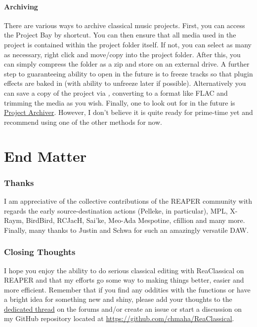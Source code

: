 \documentclass[10pt,american]{article}
\begin{document}
\subsection{Archiving}

There are various ways to archive classical music projects. First, you can
access the Project Bay by  shortcut. You can then ensure that all
media used in the project is contained within the project folder itself. If not,
you can select as many as necessary, right click and move/copy into the project
folder. After this, you can simply compress the folder as a zip and store on an
external drive. A further step to guaranteeing ability to open in the future is
to freeze tracks so that plugin effects are baked in (with ability to unfreeze
later if possible). Alternatively you can save a copy of the project via
 \emph{,} converting to a format like FLAC and
trimming the media as you wish. Finally, one to look out for in the future is
\href{https://forum.cockos.com/showthread.php?t=280150}{Project Archiver}.
However, I don't believe it is quite ready for prime-time yet and recommend
using one of the other methods for now.\pagebreak{}

\part{End Matter}

\section{Thanks}
\noindent\begin{flushleft} I am appreciative of the collective contributions of
the REAPER community with regards the early source-destination actions (Pelleke,
in particular), MPL, X-Raym, BirdBird, RCJacH, Sai'ke, Meo-Ada Mespotine,
cfillion and many more. Finally, many thanks to Justin and Schwa for such an
amazingly versatile DAW. \par\end{flushleft}

\section{Closing Thoughts}
\noindent\begin{flushleft} I hope you enjoy the ability to do serious classical
editing with ReaClassical on REAPER and that my efforts go some way to making
things better, easier and more efficient. Remember that if you find any oddities
with the functions or have a bright idea for something new and shiny, please add
your thoughts to the
\href{https://forum.cockos.com/showthread.php?t=265145}{dedicated thread} on the
forums and/or create an issue or start a discussion on my GitHub repository
located at
\href{https://github.com/chmaha/ReaClassical}{https://github.com/chmaha/ReaClassical}.
\par\end{flushleft}
\end{document}
